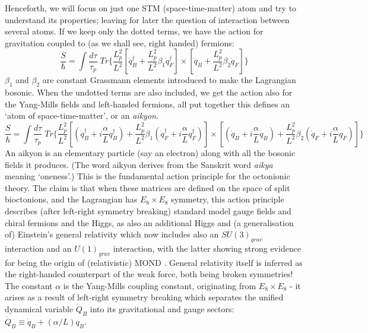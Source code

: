 \documentclass[a4paper]{jpconf}
\begin{document}
Henceforth, we will focus on just one STM (space-time-matter) atom and try to understand its properties; leaving for later the question of interaction between several atoms. If we keep only the dotted terms, we have the action for gravitation coupled to (as we shall see, right handed) fermions:
\begin{equation}
\frac{S}{\hbar}= \int \frac{d\tau}{\tau_{p}}\; Tr \bigg\{ \frac{L_p^2}{L^2}\left[\dot{q}_B^\dagger +  \frac{L_p^2}{L^2}\beta_1 \dot{q}_F^\dagger \right ] \times \left[\dot{q}_B + \frac{L_p^2}{L^2} \beta_2 \dot{q}_F\right] \bigg\}
\end{equation}
$\beta_1$ and $\beta_2$ are constant Grassmann elements introduced to make the Lagrangian bosonic.
When the undotted terms are also included, we get the action also for the Yang-Mills fields and 
left-handed fermions, all put together this  defines an `atom of space-time-matter', or an {\it aikyon}. 
\begin{equation}
\frac{S}{\hbar}= \int \frac{d\tau}{\tau_{p}}\; Tr \bigg\{ \frac{L_p^2}{L^2}\left[\left(\dot{q}_B^\dagger + i\frac{\alpha}{L} q_B^\dagger\right) + \frac{L_p^2}{L^2}\beta_1\left( \dot{q}_F^\dagger + i\frac{\alpha}{L}q_F^\dagger\right)\right ] \times \left[\left(\dot{q}_B + i\frac{\alpha}{L}q_B\right) + \frac{L_p^2}{L^2} \beta_2 \left(\dot{q}_F+ i\frac{\alpha}{L}q_F\right)\right] \bigg\}
 \label{aikyacn2}
 \end{equation}
 An aikyon is an elementary particle (say an electron) along with all the bosonic fields it produces. (The word aikyon derives from the Sanskrit word {\it aikya} meaning `oneness'.) 
 This is the fundamental action principle for the octonionic theory. The claim is that when these matrices are defined on the space of split bioctonions, and the Lagrangian has $E_8 \times E_8$ symmetry, this action principle describes (after left-right symmetry breaking) standard model gauge fields and chiral fermions and the Higgs, as also an additional Higgs and (a generalisation of) Einstein's general relativity which now  includes also  an $SU(3)_{grav}$ interaction and an $U(1)_{grav}$ interaction, with the latter showing strong evidence for being the origin of (relativistic) MOND \cite{Jose}. General relativity itself is inferred as the right-handed counterpart of the weak force, both being broken symmetries! The constant $\alpha$ is the Yang-Mills coupling constant, originating from $E_8\times E_8$ - it arises as a result of left-right symmetry breaking which separates the unified dynamical variable $\dot{Q}_B$ into its gravitational and gauge sectors: $\dot{Q}_B\equiv \dot{q}_B + (\alpha/L) q_B$.
 
\end{document}
